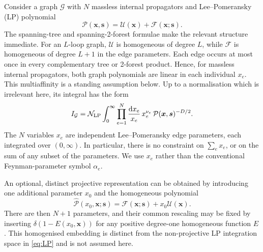 \documentclass[a4paper,11pt]{article}
\newcommand{\x}{\boldsymbol{x}}
\newcommand{\s}{\boldsymbol{s}}
\newcommand{\dd}{\mathrm d}
\begin{document}
Consider a graph \(\mathcal G\) with \(N\) massless internal propagators and Lee--Pomeransky
(LP) polynomial
\begin{equation}
  \mathcal P(\x,\s)=\mathcal U(\x)+\mathcal F(\x;\s).
\end{equation}
The spanning-tree and spanning-2-forest formulae make the relevant structure
immediate.  For an \(L\)-loop graph, \(\mathcal U\) is homogeneous of degree
\(L\), while \(\mathcal F\) is homogeneous of degree \(L+1\) in the edge
parameters.  Each edge occurs at most once in every complementary
tree or 2-forest product.  Hence, for massless internal propagators, both
graph polynomials are linear in each individual \(x_e\).  This
multiaffinity is a standing assumption below.
Up to a normalisation which is irrelevant here, its integral has the form
\begin{equation}
 I_{\mathcal G}
 =
 \mathcal N_{\rm LP}
 \int_0^\infty
 \prod_{e=1}^{N}\frac{\dd x_e}{x_e}\,x_e^{\nu_e}\,
 \mathcal P(\x,\s)^{-D/2}.
\label{eq:LP}
\end{equation}
The \(N\) variables \(x_e\) are independent Lee--Pomeransky edge parameters,
each integrated over \((0,\infty)\).  In particular, there is no constraint
on \(\sum_e x_e\), or on the sum of any subset of the parameters.  We use
\(x_e\) rather than the conventional Feynman-parameter symbol \(\alpha_e\).

An optional, distinct projective representation can be obtained by
introducing one additional parameter \(x_0\) and the homogeneous polynomial
\begin{equation}
 \widehat{\mathcal P}(x_0,\x;\s)
 =\mathcal F(\x;\s)+x_0\mathcal U(\x).
\label{eq:homogenised-LP}
\end{equation}
There are then \(N+1\) parameters, and their common rescaling may be fixed by
inserting \(\delta(1-E(x_0,\x))\) for any positive degree-one homogeneous
function \(E\).  This homogenised embedding is distinct from the
non-projective LP integration space in \eqref{eq:LP} and is not assumed here.
\end{document}
